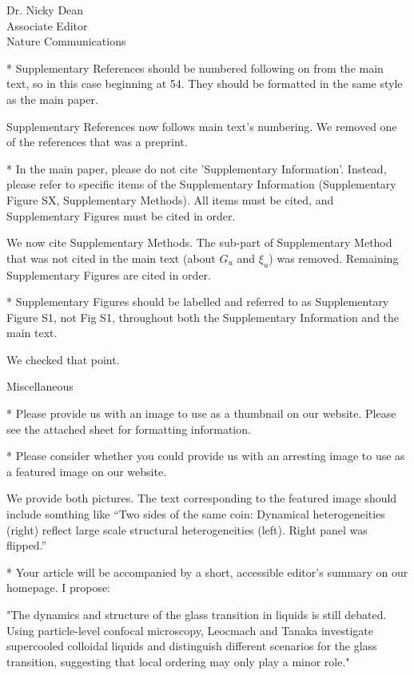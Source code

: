 \documentclass[a4paper, rebuttal, parskip=true, firsthead=false, fromemail=true, foldmarks=false]{scrlttr2}
\begin{document}
\begin{letter}{Dr. Nicky Dean\\
Associate Editor\\
Nature Communications}
\begin{quotationi}
* Supplementary References should be numbered following on from the main text, so in this case beginning at 54. They should be formatted in the same style as the main paper.
\end{quotationi}
Supplementary References now follows main text's numbering. We removed one of the references that was a preprint.


\begin{quotationi}
* In the main paper, please do not cite 'Supplementary Information'. Instead, please refer to specific items of the Supplementary Information (Supplementary Figure SX, Supplementary Methods). All items must be cited, and Supplementary Figures must be cited in order.
\end{quotationi}

We now cite Supplementary Methods. The sub-part of Supplementary Method that was not cited in the main text (about $G_u$ and $\xi_u$) was removed. Remaining Supplementary Figures are cited in order.

\begin{quotationi}
* Supplementary Figures should be labelled and referred to as Supplementary Figure S1, not Fig S1, throughout both the Supplementary Information and the main text.
\end{quotationi}
We checked that point.


\textsf{Miscellaneous}
\begin{quotationi}

* Please provide us with an image to use as a thumbnail on our website. Please see the attached sheet for formatting information.

* Please consider whether you could provide us with an arresting image to use as a featured image on our website.
\end{quotationi}
We provide both pictures. The text corresponding to the featured image should include somthing like ``Two sides of the same coin: Dynamical heterogeneities (right) reflect large scale structural heterogeneities (left). Right panel was flipped.''

\begin{quotationi}
* Your article will be accompanied by a short, accessible editor's summary on our homepage. I propose:

"The dynamics and structure of the glass transition in liquids is still debated. Using particle-level confocal microscopy, Leocmach and Tanaka investigate supercooled colloidal liquids and distinguish different scenarios for the glass transition, suggesting that local ordering may only play a minor role."


\end{quotationi}
\end{letter}
\end{document}
